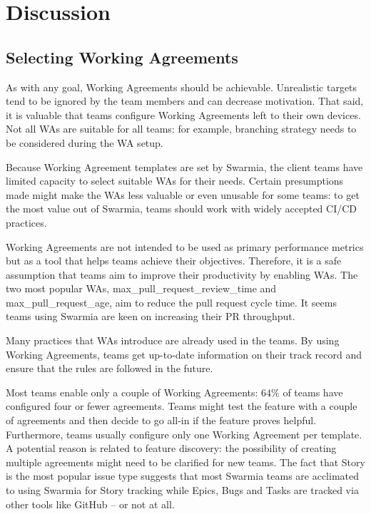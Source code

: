 \chapter{Discussion}

\section{Selecting Working Agreements}


As with any goal, Working Agreements should be achievable. Unrealistic targets tend to be ignored by the team members and can decrease motivation. That said, it is valuable that teams configure Working Agreements left to their own devices. Not all WAs are suitable for all teams: for example, branching strategy needs to be considered during the WA setup.  

Because Working Agreement templates are set by Swarmia, the client teams have limited capacity to select suitable WAs for their needs. Certain presumptions made might make the WAs less valuable or even unusable for some teams: to get the most value out of Swarmia, teams should work with widely accepted CI/CD practices. 

Working Agreements are not intended to be used as primary performance metrics but as a tool that helps teams achieve their objectives. Therefore, it is a safe assumption that teams aim to improve their productivity by enabling WAs. The two most popular WAs, max\_pull\_request\_review\_time and max\_pull\_request\_age, aim to reduce the pull request cycle time. It seems teams using Swarmia are keen on increasing their PR throughput. 

Many practices that WAs introduce are already used in the teams. By using Working Agreements, teams get up-to-date information on their track record and ensure that the rules are followed in the future. 

Most teams enable only a couple of Working Agreements: $64\%$ of teams have configured four or fewer agreements. Teams might test the feature with a couple of agreements and then decide to go all-in if the feature proves helpful. Furthermore, teams usually configure only one Working Agreement per template. A potential reason is related to feature discovery: the possibility of creating multiple agreements might need to be clarified for new teams. The fact that Story is the most popular issue type suggests that most Swarmia teams are acclimated to using Swarmia for Story tracking while Epics, Bugs and Tasks are tracked via other tools like GitHub – or not at all.

